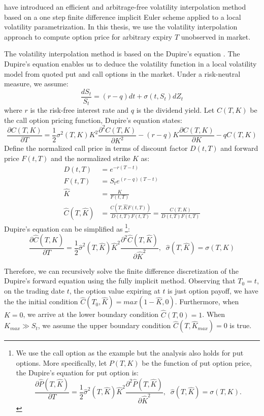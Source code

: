 \documentclass[letterpaper,12pt,titlepage,oneside,final]{book}
\numberwithin{equation}{section}
\theoremstyle{definition}
\begin{document}
\citet{andreasen2010volatility} have introduced an efficient and arbitrage-free volatility interpolation method based on a one step finite difference implicit Euler scheme applied to a local volatility parametrization. In this thesis, we use the volatility interpolation approach to compute option price for arbitrary expiry $T$ unobserved in market.




The volatility interpolation method is based on the Dupire's equation \cite{dupire1994pricing}.  The Dupire's equation enables us to deduce the volatility function in a local volatility
model from quoted put and call options in the market.
Under a risk-neutral measure, we assume:
	\[
	\frac{d S_t}{ S_t}= \left(r-q\right)dt +\sigma(t,S_t) dZ_t
	\]
where $r$ is the risk-free interest rate and $q$ is the dividend yield.
 Let $C(T,K)$ be the call option pricing function, Dupire's equation states:
	\[
	\frac{\partial C(T,K)}{\partial T}=\frac{1}{2} {\sigma}^2(T,K)K^2  \frac{\partial^2 C(T,K)}{ \partial K^2}-(r-q) K\frac{\partial C(T,K)}{\partial K}-qC(T,K)
	\]
Define the normalized call price in terms of discount factor $D(t,T)$ and forward price $F(t,T)$ and the normalized strike $\widehat{K}$ as:
\[
\begin{split}
D(t,T)&=e^{-r(T-t)}\\
F(t,T)&=S_te^{(r-q)(T-t)}\\
\widehat{K}&=\frac{K}{F(t,T)}\\
\widehat{C}(T,\widehat{K})&=\frac{C(T,\widehat{K} F(t,T))}{D(t,T)F(t,T)}=\frac{C(T,K)}{D(t,T)F(t,T)}
\end{split}
\]
Dupire's equation can be simplified as \cite{andreasen2010volatility}\footnote{
	 We use the call option as the example but the analysis also holds for put options. More specifically, let $P(T,K)$	be the function of put option price, the Dupire's equation for put option is:
	\[
	\frac{\partial \widehat{P}(T,\widehat{K})}{\partial T}=\frac{1}{2} \widehat{\sigma}^2(T,\widehat{K}) \widehat{K}^2  \frac{\partial^2 \widehat{P}(T,\widehat{K})}{ \partial \widehat{K}^2},\;\; \widehat{\sigma}(T,\widehat{K})={\sigma}(T,K).
	\]
}:
\[
\frac{\partial \widehat{C}(T,\widehat{K})}{\partial T}=\frac{1}{2} \widehat{\sigma}^2(T,\widehat{K}) \widehat{K}^2  \frac{\partial^2 \widehat{C}(T,\widehat{K})}{ \partial \widehat{K}^2},\;\; \widehat{\sigma}(T,\widehat{K})={\sigma}(T,K)
\]

Therefore, we can recursively solve the finite difference  discretization of the Dupire's forward equation using the fully implicit method.
Observing that $T_0=t$, on the trading date $t$, the option value expiring at $t$ is just option payoff, we have the the initial condition $\widehat{C}(T_0,\widehat{K})=max(1-\widehat{K},0)$.
Furthermore, when $K=0$, we arrive at the lower boundary condition $\widehat{C}(T,0)=1$. When $K_{max}\gg S_t$, we assume the upper boundary condition $\widehat{C}(T,\widehat{K}_{max})=0$ is true. 
\end{document}
